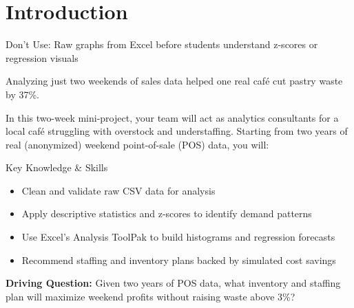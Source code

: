 
\section{Introduction}
\begin{Replace}
Don't Use: Raw graphs from Excel before students understand z-scores or regression visuals
\end{Replace}

\begin{Trivia}
Analyzing just two weekends of sales data helped one real café cut pastry waste by 37\%.
\end{Trivia}

In this two-week mini-project, your team will act as analytics consultants for a local café struggling with overstock and understaffing. Starting from two years of real (anonymized) weekend point-of-sale (POS) data, you will:

\begin{skillbox}{Key Knowledge \& Skills}
\begin{itemize}
  \item Clean and validate raw CSV data for analysis
  \item Apply descriptive statistics and z-scores to identify demand patterns
  \item Use Excel's Analysis ToolPak to build histograms and regression forecasts
  \item Recommend staffing and inventory plans backed by simulated cost savings
\end{itemize}
\end{skillbox}

\begin{Important}
\textbf{Driving Question:} Given two years of POS data, what inventory and staffing plan will maximize weekend profits without raising waste above 3\%?
\end{Important}


\clearpage

